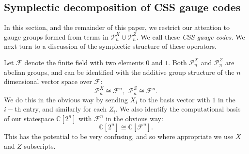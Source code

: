 \documentclass[a4paper,onecolumn,11pt,unpublished]{quantumarticle}
\def\Complex{\mathbb{C}}
\def\Z{\mathbb{Z}}
\def\Pauli{\mathcal{P}}
\newcommand{\Field}{\mathcal{F}}
\def\Fn{\Field^n}
\begin{document}
%
%

%
\subsection{Symplectic decomposition of CSS gauge codes}\label{Sec36}


In this section, and the remainder of this paper,
we restrict our
attention to gauge groups formed from terms 
in $\Pauli_n^X\cup\Pauli_n^Z.$
We call these \emph{CSS gauge codes.}
We next turn to a discussion of the symplectic structure of
these operators.

Let $\Field$ denote the finite field with two elements $0$ and $1$.
Both $\Pauli^X_n$ and $\Pauli^Z_n$ are abelian groups,
and can be identified with the additive 
group structure of the $n$ dimensional vector space
over $\Field:$
$$
    \Pauli^X_n \cong \Fn,  \ \ 
    \Pauli^Z_n \cong \Fn. 
$$
We do this in the obvious way by sending $X_i$ to the basis vector with
$1$ in the $i-$th entry, and similarly for each $Z_i$. 
We also identify the computational basis of our statespace $\Complex[2^n]$
with $\Fn$ in the obvious way:
$$
\Complex[2^n] \cong \Complex[\Fn].
$$
This has the potential to be very confusing, and
so where appropriate we use $X$ and $Z$ subscripts.
\end{document}
